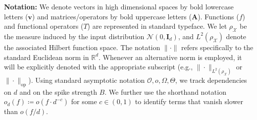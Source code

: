 {\bf Notation:}
We denote vectors in high dimensional spaces by bold lowercase letters ($\bm v$) and matrices/operators by bold uppercase letters ($\bm A$). Functions ($f$) and functional operators ($T$) are represented in standard typeface. We let $\rho_{\mathcal{X}}$ be the measure induced by the input distribution $\mathcal{N}(0, \bm I_d)$, and $L^2(\rho_{\mathcal{X}})$ denote the associated Hilbert function space. The notation $\|\cdot\|$ refers specifically to the standard Euclidean norm in $\mathbb{R}^d$. Whenever an alternative norm is employed, it will be explicitly denoted with the appropriate subscript (e.g., $\|\cdot\|_{L^2(\rho_{\mathcal X})}$ or $\|\cdot\|_\text{op}$). Using standard asymptotic notation $\mathcal{O}, o, \Omega, \Theta$, we track dependencies on $d$ and on the spike strength $B$. We further use the shorthand notation $o_d(f) \coloneqq o(f \cdot d^{-c})$ for some $c \in (0, 1)$ to identify terms that vanish slower than $o(f/d)$.